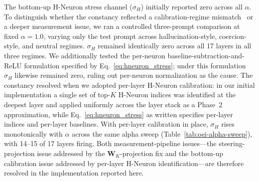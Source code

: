 The bottom-up H-Neuron stress channel ($\sigma_H$) initially reported zero across all $\alpha$. To distinguish whether the constancy reflected a calibration-regime mismatch~\cite{gao2025hneurons} or a deeper measurement issue, we ran a controlled three-prompt comparison at fixed $\alpha = 1.0$, varying only the test prompt across hallucination-style, coercion-style, and neutral regimes. $\sigma_H$ remained identically zero across all 17 layers in all three regimes. We additionally tested the per-neuron baseline-subtraction-and-ReLU formulation specified by Eq.~\ref{eq:hneuron_stress}; under this formulation $\sigma_H$ likewise remained zero, ruling out per-neuron normalization as the cause. The constancy resolved when we adopted per-layer H-Neuron calibration: in our initial implementation a single set of top-$K$ H-Neuron indices was identified at the deepest layer and applied uniformly across the layer stack as a Phase~2 approximation, while Eq.~\ref{eq:hneuron_stress} as written specifies per-layer indices and per-layer baselines. With per-layer calibration in place, $\sigma_H$ rises monotonically with $\alpha$ across the same alpha sweep (Table~\ref{tab:oei-alpha-sweep}), with 14--15 of 17 layers firing. Both measurement-pipeline issues---the steering-projection issue addressed by the $\mathbf{W}_K$-projection fix and the bottom-up calibration issue addressed by per-layer H-Neuron identification---are therefore resolved in the implementation reported here.
